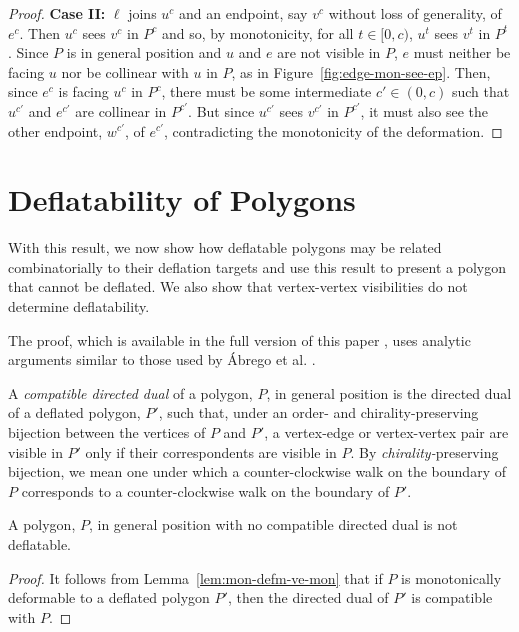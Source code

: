 \documentclass{patmorin}
\begin{document}
\begin{proof}
  \noindent\textbf{Case II:} $\ell$ joins $u^c$ and an
  endpoint, say $v^c$ without loss of generality, of $e^c$.  Then
  $u^c$ sees $v^c$ in $P^c$ and so, by monotonicity, for all
  $t\in[0,c)$, $u^t$ sees $v^t$ in $P^t$.  Since $P$ is in general
  position and $u$ and $e$ are not visible in $P$, $e$ must neither be
  facing $u$ nor be collinear with $u$ in $P$, as in
  Figure~\ref{fig:edge-mon-see-ep}.  Then, since $e^c$ is facing $u^c$
  in $P^c$, there must be some intermediate $c'\in(0,c)$ such that
  $u^{c'}$ and $e^{c'}$ are collinear in $P^{c'}$.  But since $u^{c'}$
  sees $v^{c'}$ in $P^{c'}$, it must also see the other endpoint,
  $w^{c'}$, of $e^{c'}$, contradicting the monotonicity of the
  deformation.
\end{proof}

\section{Deflatability of Polygons}

With this result, we now show how deflatable polygons may be related
combinatorially to their deflation targets and use this result to
present a polygon that cannot be deflated.  We also show that
vertex-vertex visibilities do not determine deflatability.

\else %

The proof, which is available in the full version of this
paper \cite{Bose12}, uses analytic arguments similar to those used by
{\'A}brego et al. \cite{Abrego11}.

\fi


A \emph{compatible directed dual} of a polygon, $P$, in general
position is the directed dual of a deflated polygon, $P'$, such that,
under an order- and chirality-preserving bijection between the
vertices of $P$ and $P'$, a vertex-edge or vertex-vertex pair are
visible in $P'$ only if their correspondents are visible in $P$.  By
\emph{chirality-}preserving bijection, we mean one under which a
counter-clockwise walk on the boundary of $P$ corresponds to a
counter-clockwise walk on the boundary of $P'$.

\begin{theorem}
  \label{thm:no-cdd-not-defl}
  A polygon, $P$, in general position with no compatible directed dual
  is not deflatable.
\end{theorem}
\begin{proof}
  It follows from Lemma~\ref{lem:mon-defm-ve-mon} that if $P$ is
  monotonically deformable to a deflated polygon $P'$, then the
  directed dual of $P'$ is compatible with $P$.
\end{proof}
\end{document}

